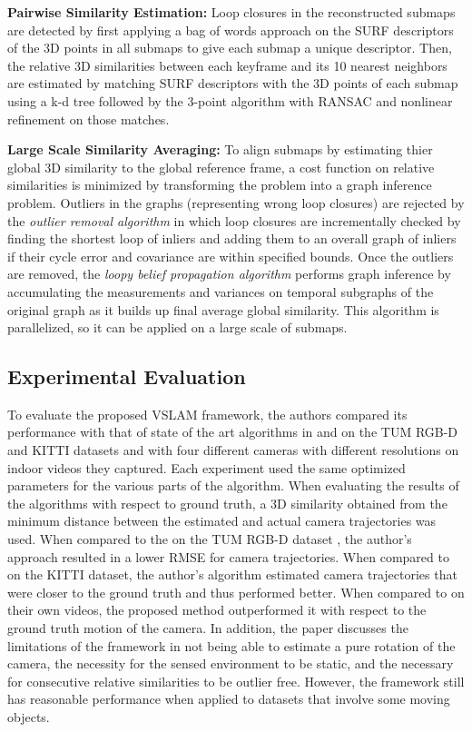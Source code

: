 \documentclass[10pt,twocolumn,letterpaper]{article}
\begin{document}
\textbf{Pairwise Similarity Estimation:} Loop closures in the reconstructed submaps are 
detected by first applying a bag of words approach on the SURF descriptors of the 3D 
points in all submaps to give each submap a unique descriptor. Then, the relative 
3D similarities between each keyframe and its 10 nearest neighbors are estimated by 
matching SURF descriptors with the 3D points of each submap using a k-d tree followed by the
 3-point algorithm \cite{17} with RANSAC and nonlinear refinement on 
those matches.

\textbf{Large Scale Similarity Averaging:} To align submaps by 
estimating thier global 3D similarity to the global reference frame, a cost function on relative 
similarities is minimized by transforming the problem into a graph inference problem. 
Outliers in the graphs (representing wrong loop closures) are rejected by the 
\textit{outlier removal algorithm} \cite{Bourmaud_2015_CVPR} in which loop closures are incrementally checked 
by finding the shortest loop of inliers and adding them to an overall graph of inliers 
if their cycle error and covariance are within specified bounds. 
Once the outliers are removed, the \textit{loopy belief propagation algorithm} 
\cite{Bourmaud_2015_CVPR} performs 
graph inference by accumulating the measurements and variances on temporal 
subgraphs of the original graph as it builds up final average global similarity. 
This algorithm is parallelized, so it can be applied on a large scale of submaps.

\subsection{Experimental Evaluation}
To evaluate the proposed VSLAM framework, the authors compared its performance 
with that of state of the art algorithms in \cite{10} and \cite{12} on the TUM RGB-D \cite{29} 
and KITTI \cite{mv31} datasets and 
with four different cameras with different resolutions on indoor videos they captured. 
Each experiment used the same optimized parameters for the various parts of the algorithm. 
When evaluating the results of the algorithms with respect to ground truth, a 3D similarity 
obtained from the minimum distance between the estimated and actual camera trajectories 
was used. When compared to the \cite{10} on the TUM RGB-D dataset , the author's approach 
resulted in a 
lower RMSE for camera trajectories. 
When compared to \cite{12} on the KITTI dataset, 
the author's algorithm estimated camera trajectories that were closer to the ground truth and 
thus performed better. When compared to \cite{10} on their own videos, the proposed 
method outperformed it with respect to the ground truth motion of the camera. 
In addition, the paper discusses the limitations of the framework in not being able to 
estimate a pure rotation of the camera, the necessity for the sensed environment 
to be static, and the necessary for consecutive relative similarities to be outlier free. 
However, the framework still has reasonable performance when applied to datasets 
that involve some moving objects.
\end{document}
